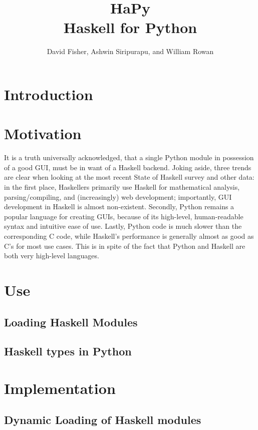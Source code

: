 \documentclass[11pt, letterpaper, oneside, twocolumn] {article}
\begin{document}
\title{HaPy \\
Haskell for Python
}
\author{David Fisher, Ashwin Siripurapu, and William Rowan}
\maketitle

\section{Introduction}

\section{Motivation}
It is a truth universally acknowledged, that a single Python module in possession of a good GUI, must be in want of a Haskell backend. Joking aside, three trends are clear when looking at the most recent State of Haskell survey and other data: in the first place, Haskellers primarily use Haskell for mathematical analysis, parsing/compiling, and (increasingly) web development; importantly, GUI development in Haskell is almost non-existent. Secondly, Python remains a popular language for creating GUIs, because of its high-level, human-readable syntax and intuitive ease of use. Lastly, Python code is much slower than the corresponding C code, while Haskell's performance is generally almost as good as C's for most use cases. This is in spite of the fact that Python and Haskell are both very high-level languages. 

\section{Use}

\subsection{Loading Haskell Modules}

\subsection{Haskell types in Python}

\section{Implementation}

\subsection{Dynamic Loading of Haskell modules}
\end{document}
